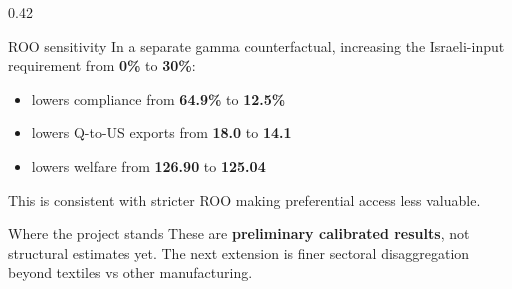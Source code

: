\documentclass[aspectratio=169,10pt]{beamer}
\begin{document}
\begin{frame}[t]
\begin{columns}[T,onlytextwidth]
\begin{column}{0.42\textwidth}
        \begin{block}{ROO sensitivity}
        \small
        In a separate gamma counterfactual, increasing the Israeli-input requirement from \textbf{0\%} to \textbf{30\%}:
        \begin{itemize}
            \item lowers compliance from \textbf{64.9\%} to \textbf{12.5\%}
            \item lowers Q-to-US exports from \textbf{18.0} to \textbf{14.1}
            \item lowers welfare from \textbf{126.90} to \textbf{125.04}
        \end{itemize}
        This is consistent with stricter ROO making preferential access less valuable.
        \end{block}

        \begin{block}{Where the project stands}
        \small
        These are \textbf{preliminary calibrated results}, not structural estimates yet. The next extension is finer sectoral disaggregation beyond textiles vs other manufacturing.
        \end{block}
    \end{column}
\end{columns}
\end{frame}
\end{document}
